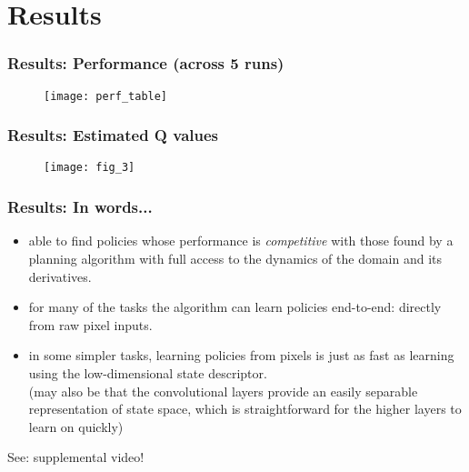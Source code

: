 \section{Results}

\begin{frame}
\frametitle{Results: Performance (across 5 runs)}
\begin{figure}
    \centering
    \texttt{[image: perf\_table]}
\end{figure}
\end{frame}

\begin{frame}
\frametitle{Results: Estimated Q values}

\begin{figure}
    \centering
    \texttt{[image: fig\_3]}
\end{figure}

\end{frame}

\begin{frame}
\frametitle{Results: In words...}

\begin{itemize}
  \item able to find policies whose performance is \emph{competitive} with
  those found by a planning algorithm with full access to the dynamics of the domain and its derivatives.
  \item for many of the tasks the algorithm can learn policies end-to-end: directly from raw pixel inputs.
  \item in some simpler tasks, learning policies from pixels is just as fast as learning using the low-dimensional state descriptor.\\
  (may also be that the convolutional layers provide an easily separable representation of state space,
  which is straightforward for the higher layers to learn on quickly)
\end{itemize}

See: supplemental video!
\end{frame}
